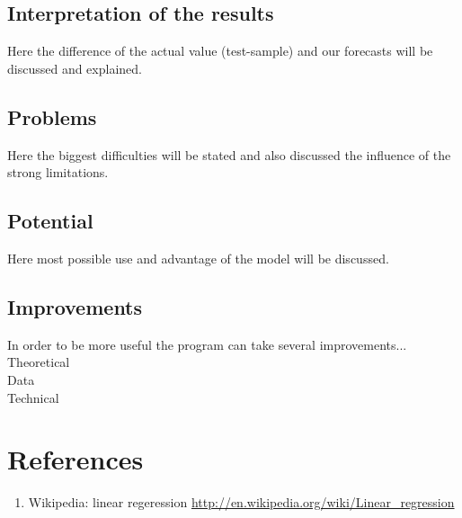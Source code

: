 \documentclass {article}
\begin{document}
\subsection{Interpretation of the results}
Here the difference of the actual value (test-sample) and our forecasts will be discussed and explained.
\subsection{Problems}
Here the biggest difficulties will be stated and also discussed the influence of the strong limitations.
\subsection{Potential}
Here most possible use and advantage of the model will be discussed.
\subsection{Improvements}
In order to be more useful the program can take several improvements...\\
Theoretical\\
Data\\
Technical

\newpage
\section{References}
\begin{enumerate}
	\item Wikipedia: linear regeression \url{http://en.wikipedia.org/wiki/Linear_regression}
\end{enumerate}
\end{document}
